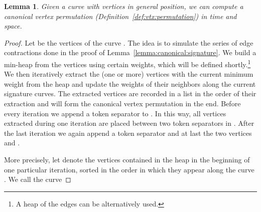 \documentclass[11pt, letter]{article}
\newtheorem{lemma}[theorem]{Lemma}
\newcommand{\lemlab}[1]{\label{lemma:#1}}
\newcommand{\lemref}[1]{Lemma~\ref{lemma:#1}}
\newcommand{\defref}[1]{Definition~\ref{def:#1}}
\begin{document}
\begin{lemma}\lemlab{compute:vtx:permutation}
Given a curve   with  vertices
in general position, we can compute a canonical vertex permutation (\defref{vtx:permutation}) in  time and  space.
\end{lemma}
\begin{proof}
Let  be the vertices of the curve .
The idea is to simulate the series of edge contractions done in the proof of \lemref{canonical:signature}. We build a min-heap from the vertices  using certain weights, which will be defined shortly.\footnote{A heap of the edges can be alternatively used.} We then iteratively extract the (one or more) vertices with the current minimum weight from the heap and update the weights of their neighbors along the current signature curves. The extracted vertices are recorded in a list  in the order of their extraction and will form the canonical vertex permutation in the end. Before every iteration we append a token separator to . In this way, all vertices extracted during one iteration are placed between two token separators in . After the last iteration we again append a token separator and at last the two vertices  and .

More precisely, let  denote the vertices contained in the heap in the beginning of one particular iteration, sorted in the order in which they appear along the curve . We call the curve
 

\end{proof}
\end{document}

